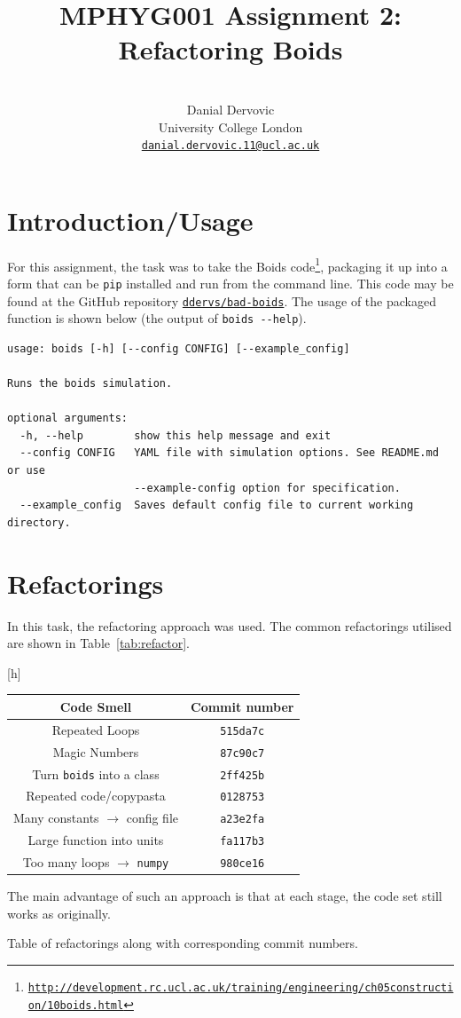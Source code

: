 \documentclass{article}
\title{MPHYG001 Assignment 2: Refactoring Boids}
\author{\\
Danial Dervovic\\
\normalsize University College London\\
\normalsize \href{mailto:danial.dervovic.11@ucl.ac.uk}{\texttt{danial.dervovic.11@ucl.ac.uk}}
}
\begin{document}
\maketitle
\section*{Introduction/Usage}
For this assignment, the task was to take the Boids code\footnote{\href{http://development.rc.ucl.ac.uk/training/engineering/ch05construction/10boids.html}{\texttt{http://development.rc.ucl.ac.uk/training/engineering/ch05construction/10boids.html}}}, packaging it up into a form that can be \texttt{pip} installed and run from the command line. This code may be found at the GitHub repository \href{https://github.com/ddervs/bad-boids}{\texttt{ddervs/bad-boids}}. The usage of the packaged function is shown below (the output of \texttt{boids -{}-help}).
\begin{lstlisting}
usage: boids [-h] [--config CONFIG] [--example_config]

Runs the boids simulation.

optional arguments:
  -h, --help        show this help message and exit
  --config CONFIG   YAML file with simulation options. See README.md or use
                    --example-config option for specification.
  --example_config  Saves default config file to current working directory.
\end{lstlisting}
\section*{Refactorings}
In this task, the refactoring approach was used. The common refactorings utilised are shown in Table~\ref{tab:refactor}.
\begin{center}[h]
\begin{tabular}{|c|c|}
    \hline
    \textbf{Code Smell} & \textbf{Commit number} \\
    \hline\hline
    Repeated Loops & \texttt{515da7c} \\
    Magic Numbers & \texttt{87c90c7} \\
    Turn \texttt{boids} into a class & \texttt{2ff425b} \\
    Repeated code/copypasta & \texttt{0128753} \\
    Many constants $\rightarrow$ config file & \texttt{a23e2fa} \\
    Large function into units & \texttt{fa117b3} \\
    Too many loops $\rightarrow$ \texttt{numpy} & \texttt{980ce16} \\
    \hline
\end{tabular}
The main advantage of such an approach is that at each stage, the code set still works as originally. 
\caption{Table of refactorings along with corresponding commit numbers.}
\label{tab:refactor}
\end{center}
\end{document}
